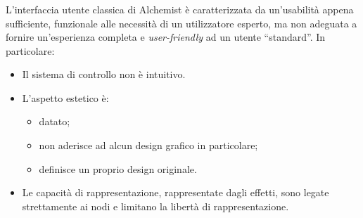 \documentclass[%
]{beamer}
\newcommand{\engEmph}[1] {\emph{\foreignlanguage{english}#1}}
\begin{document}
    \begin{frame}
        \frametitle{\insertsection}
        \centering
    \end{frame}

    \begin{frame}
        \frametitle{\insertsection}

        L'interfaccia utente classica di Alchemist è caratterizzata da un'usabilità appena sufficiente, funzionale alle necessità di un utilizzatore esperto, ma non adeguata a fornire un'esperienza completa e \engEmph{user-friendly} ad un utente ``standard''.
        In particolare:

        \begin{itemize}[<+->]
          \item
              Il sistema di controllo non è intuitivo.
          \item
              L'aspetto estetico è:
              \begin{itemize}[<+(1)->]
                  \item datato;
                  \item non aderisce ad alcun design grafico in particolare;
                  \item definisce un proprio design originale.
              \end{itemize}
          \item
              Le capacità di rappresentazione, rappresentate dagli effetti, sono legate strettamente ai nodi e limitano la libertà di rappresentazione.
        \end{itemize}
    \end{frame}
\end{document}
